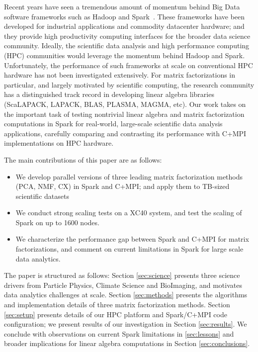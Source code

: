 Recent years have seen a tremendous amount of momentum behind Big Data software frameworks such as Hadoop and Spark~\cite{SPARK_HOTC_10}. 
These frameworks have been developed for industrial applications and commodity datacenter hardware; and they provide high productivity computing interfaces for the broader data science community.  
Ideally, the scientific data analysis and high performance computing (HPC) communities would leverage the momentum behind Hadoop and Spark.
Unfortunately, the performance of such frameworks at scale on conventional HPC hardware has not been investigated extensively. 
For matrix factorizations in particular, and largely motivated by scientific computing, the research community has a distinguished track record in developing linear algebra libraries (ScaLAPACK, LAPACK, BLAS, PLASMA, MAGMA, etc). 
Our work takes on the important task of testing nontrivial linear algebra and matrix factorization computations in Spark for real-world, large-scale scientific data analysis applications, carefully comparing and contrasting its performance with C+MPI implementations on HPC hardware. 

The main contributions of this paper are as follows:
\begin{itemize}
\item{We develop parallel versions of three leading matrix factorization methods (PCA, NMF, CX) in Spark and C+MPI; and apply them to TB-sized scientific datasets}
\item{We conduct strong scaling tests on a XC40 system, and test the scaling of Spark on up to 1600 nodes.}
\item{We characterize the performance gap between Spark and C+MPI for matrix factorizations, and comment on current limitations in Spark for large scale data analytics.}
\end{itemize}

The paper is structured as follows: Section \ref{sec:science} presents three science drivers from Particle Physics, Climate Science and BioImaging, and motivates data analytics challenges at scale. Section \ref{sec:methods} presents the algorithms and implementation details of three matrix factorization methods. Section \ref{sec:setup} presents details of our HPC platform and Spark/C+MPI code configuration; we present results of our investigation in Section \ref{sec:results}. We conclude with observations on current Spark limitations in \ref{sec:lessons} and broader implications for linear algebra computations in Section \ref{sec:conclusions}. 